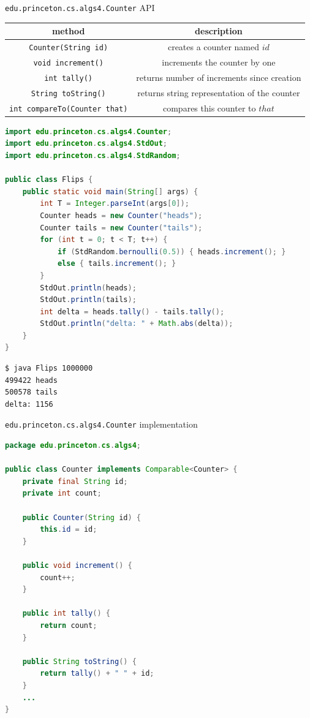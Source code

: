 \documentclass[8pt,a4paper,compress]{beamer}
\begin{document}
\begin{frame}[fragile]
\lstinline{edu.princeton.cs.algs4.Counter} API
\begin{center}
\begin{tabular}{cc}
method & description \\ \hline
\lstinline$Counter(String id)$ & creates a counter named $id$ \\
\lstinline$void increment()$ & increments the counter by one \\
\lstinline$int tally()$ & returns number of increments since creation \\
\lstinline$String toString()$ & returns string representation of the counter \\
\lstinline$int compareTo(Counter that)$ & compares this counter to $that$
\end{tabular} 
\end{center}

\begin{lstlisting}[language=Java]
import edu.princeton.cs.algs4.Counter;
import edu.princeton.cs.algs4.StdOut;
import edu.princeton.cs.algs4.StdRandom;

public class Flips {
    public static void main(String[] args) {
        int T = Integer.parseInt(args[0]);
        Counter heads = new Counter("heads");
        Counter tails = new Counter("tails");
        for (int t = 0; t < T; t++) {
            if (StdRandom.bernoulli(0.5)) { heads.increment(); }
            else { tails.increment(); }
        }
        StdOut.println(heads);
        StdOut.println(tails);
        int delta = heads.tally() - tails.tally();
        StdOut.println("delta: " + Math.abs(delta));
    }
}
\end{lstlisting}

\begin{lstlisting}[language={}]
$ java Flips 1000000
499422 heads
500578 tails
delta: 1156
\end{lstlisting}
\end{frame}

\begin{frame}[fragile]
\lstinline{edu.princeton.cs.algs4.Counter} implementation
\begin{lstlisting}[language=Java]
package edu.princeton.cs.algs4;

public class Counter implements Comparable<Counter> {
    private final String id;
    private int count;

    public Counter(String id) { 
        this.id = id; 
    }

    public void increment() { 
        count++; 
    }

    public int tally() { 
        return count; 
    }

    public String toString() { 
        return tally() + " " + id; 
    }
    ...
}
\end{lstlisting}
\end{frame}
\end{document}
